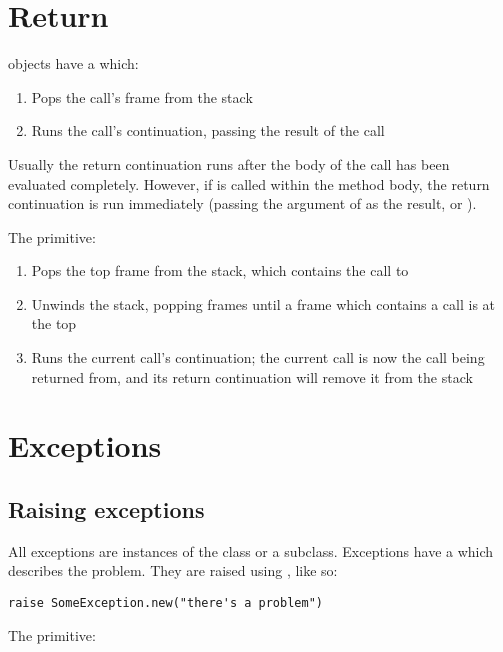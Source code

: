 \section{Return}

 objects have a  which:

\begin{enumerate}
  \item Pops the call's frame from the stack
  \item Runs the call's continuation, passing the result of the call
\end{enumerate}

Usually the return continuation runs after the body of the call has been evaluated completely. However, if  is called within the method body, the return continuation is run immediately (passing the argument of  as the result, or ).

The  primitive:

\begin{enumerate}
  \item Pops the top frame from the stack, which contains the call to 
  \item Unwinds the stack, popping frames until a frame which contains a call is at the top
  \item Runs the current call's continuation; the current call is now the call being returned from, and its return continuation will remove it from the stack
\end{enumerate}

\section{Exceptions}
\label{sec:exceptions}

\subsection{Raising exceptions}

All exceptions are instances of the  class or a subclass. Exceptions have a  which describes the problem. They are raised using , like so:

\begin{lstlisting}
raise SomeException.new("there's a problem")
\end{lstlisting}

The  primitive:

